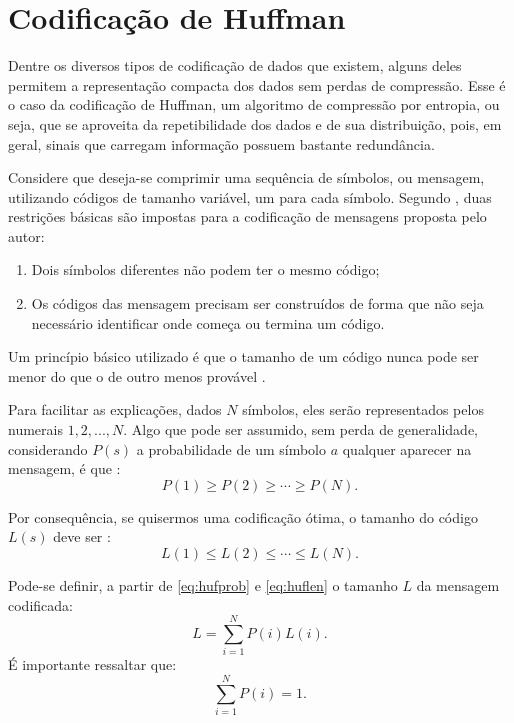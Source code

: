 \documentclass[cic,tc]{iiufrgs}
\begin{document}
\section*{Codificação de Huffman}
Dentre os diversos tipos de codificação de dados que existem, alguns deles 
permitem a representação compacta dos dados sem perdas de compressão.
Esse é o caso da codificação de Huffman, um algoritmo de compressão por entropia,
ou seja, que se aproveita da repetibilidade dos dados e de sua distribuição, 
pois, em geral, sinais que carregam informação possuem bastante redundância.

Considere que deseja-se comprimir uma sequência de 
símbolos, ou mensagem, utilizando códigos de tamanho variável, um para cada símbolo.
Segundo \citet{HuffmanCoding}, duas restrições básicas são impostas para 
a codificação de mensagens proposta pelo autor:
\begin{enumerate}
    \item Dois símbolos diferentes não podem ter o mesmo código;
    \item Os códigos das mensagem precisam ser construídos de forma que não seja necessário 
    identificar onde começa ou termina um código.
\end{enumerate}

Um princípio básico utilizado é que o tamanho de um código nunca pode ser menor 
do que o de outro menos provável \cite{HuffmanCoding}.

Para facilitar as explicações, dados $N$ símbolos, eles serão representados 
pelos numerais $1, 2, ..., N$.
Algo que pode ser assumido, sem perda de generalidade, considerando $P(s)$ a probabilidade de um símbolo
$a$ qualquer aparecer na mensagem, é que \cite{HuffmanCoding}:
\begin{equation}
    \label{eq:hufprob}
    P(1) \ge P(2) \ge \cdots \ge P(N).
\end{equation}

Por consequência, se quisermos uma codificação ótima, o tamanho do código $L(s)$ 
deve ser \cite{HuffmanCoding}:
\begin{equation}
    \label{eq:huflen}
    L(1) \le L(2) \le \cdots \le L(N).
\end{equation}

Pode-se definir, a partir de \eqref{eq:hufprob} e \eqref{eq:huflen} o tamanho $L$ da mensagem 
codificada:
\begin{equation*}
    L = \sum_{i=1}^N {P(i)L(i)}.
\end{equation*}
É importante ressaltar que:
\begin{equation*}
    \sum_{i=1}^N {P(i)} = 1.
\end{equation*}
\end{document}
